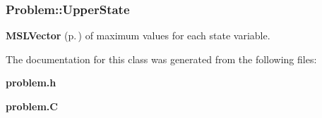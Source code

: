 \subsubsection{ Problem::Upper\-State}\label{classProblem_m6}


{\bf MSLVector} {\rm (p.\,\pageref{classMSLVector})} of maximum values for each state variable.



The documentation for this class was generated from the following files:\begin{CompactItemize}
\item 
{\bf problem.h}\item 
{\bf problem.C}\end{CompactItemize}
